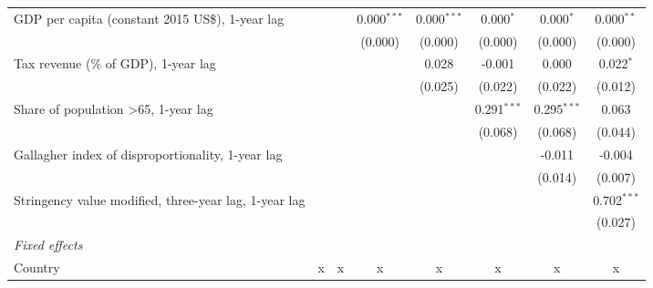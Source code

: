 \begin{tabular}{lccccccc}
   GDP per capita (constant 2015 US\$), 1-year lag                                          &             &             & 0.000$^{***}$ & 0.000$^{***}$ & 0.000$^{*}$   & 0.000$^{*}$   & 0.000$^{**}$\\   
                                                                                            &             &             & (0.000)       & (0.000)       & (0.000)       & (0.000)       & (0.000)\\   
   Tax revenue (\% of GDP), 1-year lag                                                      &             &             &               & 0.028         & -0.001        & 0.000         & 0.022$^{*}$\\   
                                                                                            &             &             &               & (0.025)       & (0.022)       & (0.022)       & (0.012)\\   
   Share of population >65, 1-year lag                                                      &             &             &               &               & 0.291$^{***}$ & 0.295$^{***}$ & 0.063\\   
                                                                                            &             &             &               &               & (0.068)       & (0.068)       & (0.044)\\   
   Gallagher index of disproportionality, 1-year lag                                        &             &             &               &               &               & -0.011        & -0.004\\   
                                                                                            &             &             &               &               &               & (0.014)       & (0.007)\\   
   Stringency value modified, three-year lag, 1-year lag                                    &             &             &               &               &               &               & 0.702$^{***}$\\   
                                                                                            &             &             &               &               &               &               & (0.027)\\   
   \emph{Fixed effects}\\
   Country                                                                                  & x           & x           & x             & x             & x             & x             & x\\  

\end{tabular}
